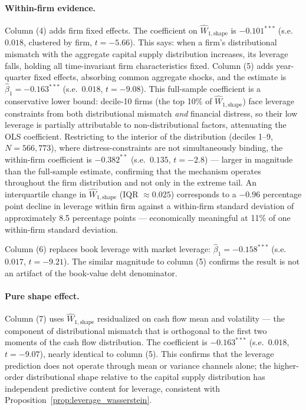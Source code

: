\paragraph{Within-firm evidence.}
Column (4) adds firm fixed effects. The coefficient on $\widehat{W}_{1,\text{shape}}$ is $-0.101^{***}$ (s.e.\ $0.018$, clustered by firm, $t = -5.66$). This says: when a firm's distributional mismatch with the aggregate capital supply distribution increases, its leverage falls, holding all time-invariant firm characteristics fixed. Column (5) adds year-quarter fixed effects, absorbing common aggregate shocks, and the estimate is $\hat{\beta}_1 = -0.163^{***}$ (s.e.\ $0.018$, $t = -9.08$). This full-sample coefficient is a conservative lower bound: decile-10 firms (the top 10\% of $\widehat{W}_{1,\text{shape}}$) face leverage constraints from both distributional mismatch \emph{and} financial distress, so their low leverage is partially attributable to non-distributional factors, attenuating the OLS coefficient. Restricting to the interior of the distribution (deciles 1--9, $N = 566{,}773$), where distress-constraints are not simultaneously binding, the within-firm coefficient is $-0.382^{**}$ (s.e.\ $0.135$, $t = -2.8$) — larger in magnitude than the full-sample estimate, confirming that the mechanism operates throughout the firm distribution and not only in the extreme tail. An interquartile change in $\widehat{W}_{1,\text{shape}}$ (IQR $\approx 0.025$) corresponds to a $-0.96$ percentage point decline in leverage within firm against a within-firm standard deviation of approximately 8.5 percentage points — economically meaningful at 11\% of one within-firm standard deviation.

Column (6) replaces book leverage with market leverage: $\hat{\beta}_1 = -0.158^{***}$ (s.e.\ $0.017$, $t = -9.21$). The similar magnitude to column (5) confirms the result is not an artifact of the book-value debt denominator.

\paragraph{Pure shape effect.}
Column (7) uses $\widehat{W}_{1,\text{shape}}$ residualized on cash flow mean and volatility — the component of distributional mismatch that is orthogonal to the first two moments of the cash flow distribution. The coefficient is $-0.163^{***}$ (s.e.\ $0.018$, $t = -9.07$), nearly identical to column (5). This confirms that the leverage prediction does not operate through mean or variance channels alone; the higher-order distributional shape relative to the capital supply distribution has independent predictive content for leverage, consistent with Proposition~\ref{prop:leverage_wasserstein}.

